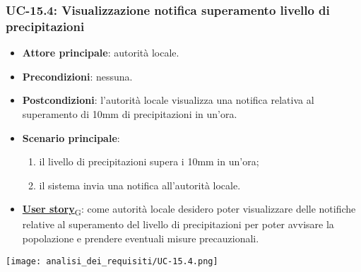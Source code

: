 \subsubsection{UC-15.4: Visualizzazione notifica superamento livello di precipitazioni}
\begin{itemize}
	\item \textbf{Attore principale}: autorità locale.
	\item \textbf{Precondizioni}: nessuna.
	\item \textbf{Postcondizioni}: l'autorità locale visualizza una notifica relativa al superamento di 10mm di precipitazioni in un'ora.
	\item \textbf{Scenario principale}:
	      \begin{enumerate}
		      \item il livello di precipitazioni supera i 10mm in un'ora;
		      \item il sistema invia una notifica all'autorità locale.
	      \end{enumerate}
	\item \href{https://7last.github.io/docs/pb/documentazione-interna/glossario\#user-story}{\textbf{User story}\textsubscript{G}}:
	      come autorità locale desidero poter visualizzare delle notifiche relative al superamento del livello di precipitazioni
	      per poter avvisare la popolazione e prendere eventuali misure precauzionali.
\end{itemize}
\begin{center}
	\texttt{[image: analisi\_dei\_requisiti/UC-15.4.png]}
\end{center}
